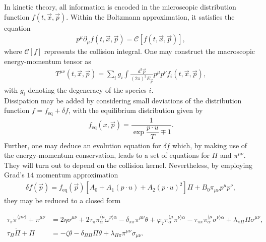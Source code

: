 In kinetic theory, all information is encoded in the microscopic distribution function $f(t,\vec{x},\vec{p})$. Within the Boltzmann approximation, it satisfies the equation
\begin{align*}
    p^{\mu} \partial_{\mu} f(t,\vec{x},\vec{p})=\mathcal{C}[f(t,\vec{x},\vec{p})],
\end{align*}
where $\mathcal{C}[f]$ represents the collision integral. One may construct the macroscopic energy-momentum tensor as
\begin{align*}
    T^{\mu \nu}(t, \vec{x}, \vec{p})=\sum\limits_ig_i \int \frac{d^{3} \vec{p}}{(2 \pi)^{3} E_{\vec{p}}} p^{\mu} p^{\nu} f_{i}(t, \vec{x}, \vec{p}),
\end{align*}
with $g_i$ denoting the degeneracy of the species $i$. \\
Dissipation may be added by considering small deviations of the distribution function $f=f_\text{eq}+\delta f$, with the equilibrium distribution given by 
\begin{align*}
    f_\text{eq}(x, \vec{p})=\dfrac{1}{\exp{\dfrac{p \cdot u}{T}} \mp 1}.
\end{align*}
Further, one may deduce an evolution equation for $\delta f$ which, by making use of the energy-momentum conservation, leads to a set of equations for $\Pi$ and $\pi^{\mu\nu}$. They will turn out to depend on the collision kernel. Nevertheless, by employing Grad's $14$ momentum approximation
\begin{align*}
    \delta f(\vec{p})=f_\text{eq}(\vec{p})\left[A_0+A_{1}(p \cdot u)+A_2(p \cdot u)^{2}\right] \Pi+B_{0} \pi_{\mu \nu} p^{\mu} p^{\nu},
\end{align*}
they may be reduced to a closed form
\begin{fullwidth}
\begin{equation*}
    \begin{aligned}
    \tau_{\pi} \dot{\pi}^{\langle\mu \nu\rangle}+\pi^{\mu \nu}&=2 \eta \sigma^{\mu \nu}+2 \tau_{\pi} \pi_{\alpha}^{\langle\mu} \omega^{\nu\rangle \alpha}-\delta_{\pi \pi} \pi^{\mu \nu} \theta+\varphi_{7} \pi_{\alpha}^{\langle\mu} \pi^{\nu\rangle \alpha}-\tau_{\pi \pi} \pi_{\alpha}^{\langle\mu} \sigma^{\nu\rangle \alpha}+\lambda_{\pi \Pi} \Pi \sigma^{\mu \nu},\\
    \tau_{\Pi} \dot{\Pi}+\Pi&=-\zeta \theta-\delta_{\Pi \Pi} \Pi \theta+\lambda_{\Pi \pi} \pi^{\mu \nu} \sigma_{\mu \nu}.
\end{aligned}
\end{equation*}
\end{fullwidth}
